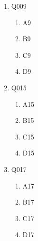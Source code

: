 \documentclass[12pt]{article}
\begin{document}
\begin{enumerate}
    \item Q009
    \begin{enumerate}[label=(\Alph*)]
        
        \item A9
        
        \item B9
        
        \item C9
        
        \item D9
        
    \end{enumerate}

    \item Q015
    \begin{enumerate}[label=(\Alph*)]
        
        \item A15
        
        \item B15
        
        \item C15
        
        \item D15
        
    \end{enumerate}

    \item Q017
    \begin{enumerate}[label=(\Alph*)]
        
        \item A17
        
        \item B17
        
        \item C17
        
        \item D17
        
    \end{enumerate}

\end{enumerate}
\end{document}
